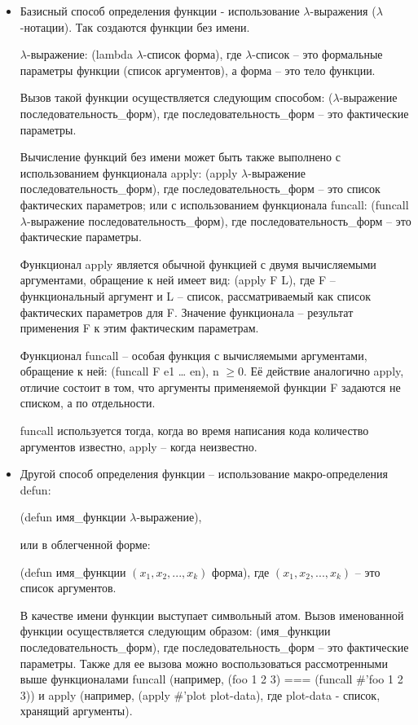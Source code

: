 \documentclass[12pt]{report}
\begin{document}
\begin{itemize}
	\item Базисный способ  определения  функции - использование $\lambda$-выражения ($\lambda$-нотации). Так создаются функции без имени.
	
	$\lambda$-выражение: (lambda $\lambda$-список форма), 
	где $\lambda$-список --  это формальные параметры функции (список аргументов), а форма -- это тело функции.
	
	Вызов такой функции осуществляется следующим способом: ($\lambda$-выражение последовательность\_форм), 
	где последовательность\_форм -- это фактические параметры.
	
	Вычисление функций без имени может быть также выполнено с использованием функционала apply: (apply $\lambda$-выражение последовательность\_форм), где последовательность\_форм -- это список фактических параметров; или с использованием функционала funcall: (funcall $\lambda$-выражение последовательность\_форм), где последовательность\_форм -- это фактические параметры.
	
	Функционал apply является обычной функцией с двумя  вычисляемыми аргументами, обращение к ней имеет вид: (apply F L), где F – функциональный аргумент и L -- список, рассматриваемый как список фактических параметров для F. Значение функционала -- результат применения F к этим фактическим параметрам.
	
	Функционал funcall – особая функция с вычисляемыми аргументами, обращение к ней: (funcall F e1 … en), n $\geqslant 0$. Её   действие аналогично apply, отличие состоит в том, что аргументы  применяемой функции F задаются не списком, а по отдельности. 
	
	funcall используется тогда, когда во время написания кода количество аргументов известно, apply -- когда неизвестно.
	
	\item Другой способ определения функции -- использование макро-определения defun: 
	
	(defun имя\_функции $\lambda$-выражение), 
	
	или  в облегченной форме:
	
	(defun имя\_функции $(x_1, x_2, ..., x_k)$ форма), 
	где $(x_1, x_2, ..., x_k)$ -- это  список аргументов.
	
	В качестве имени функции выступает символьный атом. 
	Вызов именованной функции осуществляется следующим образом: (имя\_функции последовательность\_форм), 
	где последовательность\_форм -- это фактические параметры.
	Также для ее вызова можно воспользоваться рассмотренными выше функционалами funcall (например, (foo 1 2 3) === (funcall \#'foo 1 2 3)) и apply (например, (apply \#'plot plot-data), где plot-data - список, хранящий аргументы).
	
\end{itemize}
\end{document}
